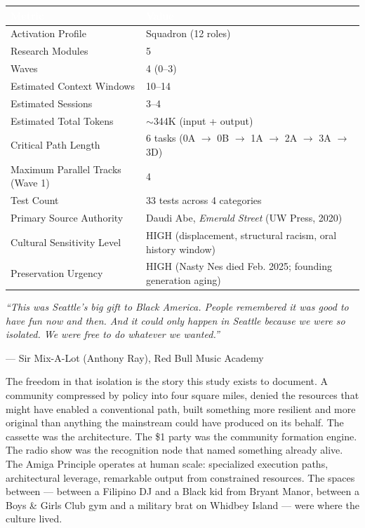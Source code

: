 \documentclass[11pt,letterpaper]{article}
\newcommand{\tableheader}[1]{\textbf{\sffamily\textcolor{white}{#1}}}
\begin{document}
\begin{center}
\begin{tabularx}{\textwidth}{L{5cm}X}
\toprule
{}
\tableheader{Metric} & \tableheader{Value} \\
\midrule
Activation Profile & Squadron (12 roles) \\
Research Modules & 5 \\
Waves & 4 (0--3) \\
Estimated Context Windows & 10--14 \\
Estimated Sessions & 3--4 \\
Estimated Total Tokens & $\sim$344K (input + output) \\
Critical Path Length & 6 tasks (0A $\rightarrow$ 0B $\rightarrow$ 1A $\rightarrow$ 2A $\rightarrow$ 3A $\rightarrow$ 3D) \\
Maximum Parallel Tracks (Wave 1) & 4 \\
Test Count & 33 tests across 4 categories \\
Primary Source Authority & Daudi Abe, \textit{Emerald Street} (UW Press, 2020) \\
Cultural Sensitivity Level & HIGH (displacement, structural racism, oral history window) \\
Preservation Urgency & HIGH (Nasty Nes died Feb. 2025; founding generation aging) \\
\bottomrule
\end{tabularx}
\end{center}

\vspace{2em}

\begin{quotebox}
\textit{``This was Seattle's big gift to Black America. People remembered it was good to have fun now and then. And it could only happen in Seattle because we were so isolated. We were free to do whatever we wanted.''}

\medskip
\hfill --- Sir Mix-A-Lot (Anthony Ray), Red Bull Music Academy

\medskip
The freedom in that isolation is the story this study exists to document. A community compressed by policy into four square miles, denied the resources that might have enabled a conventional path, built something more resilient and more original than anything the mainstream could have produced on its behalf. The cassette was the architecture. The \$1 party was the community formation engine. The radio show was the recognition node that named something already alive. The Amiga Principle operates at human scale: specialized execution paths, architectural leverage, remarkable output from constrained resources. The spaces between --- between a Filipino DJ and a Black kid from Bryant Manor, between a Boys \& Girls Club gym and a military brat on Whidbey Island --- were where the culture lived.
\end{quotebox}
\end{document}
